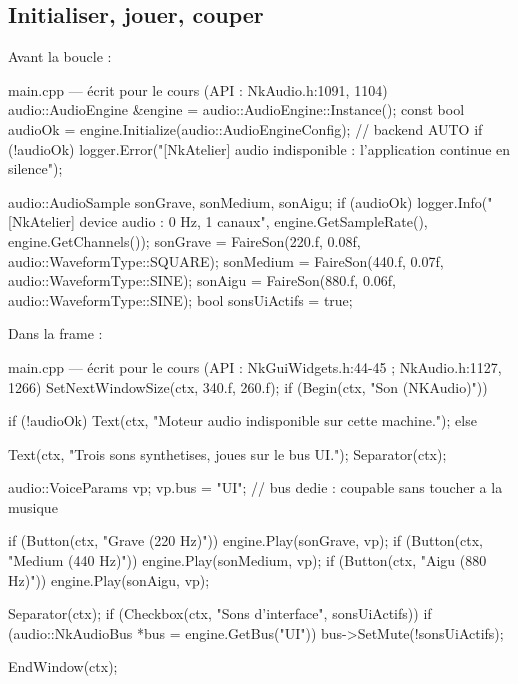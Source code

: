 \subsection{Initialiser, jouer, couper}

Avant la boucle :

\begin{nkcode}{main.cpp — écrit pour le cours (API : NkAudio.h:1091, 1104)}
    audio::AudioEngine &engine = audio::AudioEngine::Instance();
    const bool audioOk = engine.Initialize(audio::AudioEngineConfig{});   // backend AUTO
    if (!audioOk)
        logger.Error("[NkAtelier] audio indisponible : l'application continue en silence");

    audio::AudioSample sonGrave, sonMedium, sonAigu;
    if (audioOk) {
        logger.Info("[NkAtelier] device audio : {0} Hz, {1} canaux", engine.GetSampleRate(), engine.GetChannels());
        sonGrave  = FaireSon(220.f, 0.08f, audio::WaveformType::SQUARE);
        sonMedium = FaireSon(440.f, 0.07f, audio::WaveformType::SINE);
        sonAigu   = FaireSon(880.f, 0.06f, audio::WaveformType::SINE);
    }
    bool sonsUiActifs = true;
\end{nkcode}

Dans la frame :

\begin{nkcode}{main.cpp — écrit pour le cours (API : NkGuiWidgets.h:44-45 ; NkAudio.h:1127, 1266)}
        SetNextWindowSize(ctx, 340.f, 260.f);
        if (Begin(ctx, "Son (NKAudio)")) {
            if (!audioOk) {
                Text(ctx, "Moteur audio indisponible sur cette machine.");
            } else {
                Text(ctx, "Trois sons synthetises, joues sur le bus UI.");
                Separator(ctx);

                audio::VoiceParams vp;
                vp.bus = "UI";           // bus dedie : coupable sans toucher a la musique

                if (Button(ctx, "Grave (220 Hz)"))
                    engine.Play(sonGrave, vp);
                if (Button(ctx, "Medium (440 Hz)"))
                    engine.Play(sonMedium, vp);
                if (Button(ctx, "Aigu (880 Hz)"))
                    engine.Play(sonAigu, vp);

                Separator(ctx);
                if (Checkbox(ctx, "Sons d'interface", sonsUiActifs)) {
                    if (audio::NkAudioBus *bus = engine.GetBus("UI"))
                        bus->SetMute(!sonsUiActifs);
                }
            }
            EndWindow(ctx);
        }
\end{nkcode}

